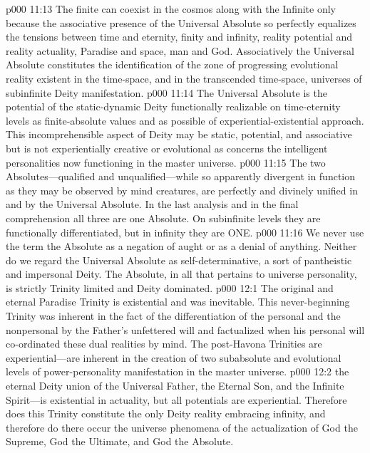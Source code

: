 \vs p000 11:13 The finite can coexist in the cosmos along with the Infinite only because the associative presence of the Universal Absolute so perfectly equalizes the tensions between time and eternity, finity and infinity, reality potential and reality actuality, Paradise and space, man and God. Associatively the Universal Absolute constitutes the identification of the zone of progressing evolutional reality existent in the time\hyp{}space, and in the transcended time\hyp{}space, universes of subinfinite Deity manifestation.
\vs p000 11:14 The Universal Absolute is the potential of the static\hyp{}dynamic Deity functionally realizable on time\hyp{}eternity levels as finite\hyp{}absolute values and as possible of experiential\hyp{}existential approach. This incomprehensible aspect of Deity may be static, potential, and associative but is not experientially creative or evolutional as concerns the intelligent personalities now functioning in the master universe.
\pc \vs p000 11:15  The two Absolutes---qual\-i\-fied and unqualified---while so apparently divergent in function as they may be observed by mind creatures, are perfectly and divinely unified in and by the Universal Absolute. In the last analysis and in the final comprehension all three are one Absolute. On subinfinite levels they are functionally differentiated, but in infinity they are ONE.
\pc \vs p000 11:16 We never use the term the Absolute as a negation of aught or as a denial of anything. Neither do we regard the Universal Absolute as self\hyp{}determinative, a sort of pantheistic and impersonal Deity. The Absolute, in all that pertains to universe personality, is strictly Trinity limited and Deity dominated.\plusone
{}
\vs p000 12:1 The original and eternal Paradise Trinity is existential and was inevitable. This never\hyp{}beginning Trinity was inherent in the fact of the differentiation of the personal and the nonpersonal by the Father’s unfettered will and factualized when his personal will co\hyp{}ordinated these dual realities by mind. The post\hyp{}Havona Trinities are experiential---are inherent in the creation of two subabsolute and evolutional levels of power\hyp{}personality manifestation in the master universe.
\pc \vs p000 12:2 the eternal Deity union of the Universal Father, the Eternal Son, and the Infinite Spirit---is existential in actuality, but all potentials are experiential. Therefore does this Trinity constitute the only Deity reality embracing infinity, and therefore do there occur the universe phenomena of the actualization of God the Supreme, God the Ultimate, and God the Absolute.
